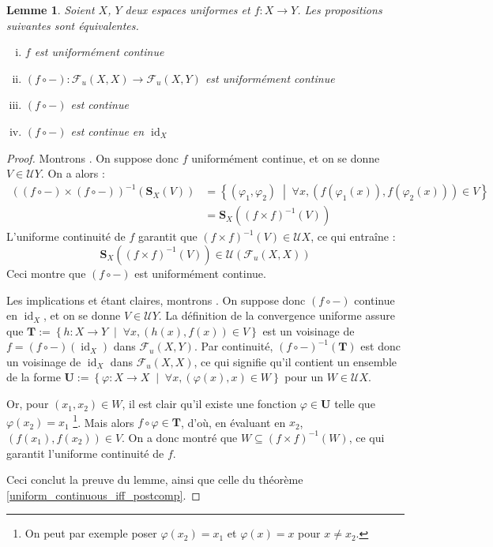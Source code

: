 \documentclass[a4paper,12pt]{article}
\newtheorem{lemma}[theorem]{Lemme}
\newcommand{\set}[1]{\left\{ #1 \right\}}
\newcommand{\tq}{\;\middle|\;}
\newcommand{\inv}{^{-1}}
\newcommand{\comp}{\circ}
\renewcommand{\implies}{\Rightarrow}
\newcommand{\blank}{{-}}
\DeclareMathOperator{\id}{id}
\begin{document}
\begin{lemma}
    Soient $X$, $Y$ deux espaces uniformes et $f:X\to Y$. Les propositions suivantes sont équivalentes.
    \begin{enumerate}[(i)]
        \item $f$ est uniformément continue
        \item $(f\comp\blank) : \mathcal{F}_u(X, X)\to\mathcal{F}_u(X, Y)$ est uniformément continue
        \item $(f\comp\blank)$ est continue
        \item $(f\comp\blank)$ est continue en $\id_X$
    \end{enumerate}
\end{lemma}

\begin{proof}
    Montrons \framebox{$(i)\implies(ii)$}. On suppose donc $f$ uniformément continue, et on se donne $V\in\mathcal{U}Y$. On a alors :
    \begin{align*}
        ((f\comp\blank)\times(f\comp\blank))\inv(\mathbf{S}_X(V)) 
            &= \set{(\varphi_1, \varphi_2)\tq\forall x, (f(\varphi_1(x)), f(\varphi_2(x)))\in V} \\
            &= \mathbf{S}_X((f\times f)\inv(V))
    \end{align*}
    L'uniforme continuité de $f$ garantit que $(f\times f)\inv(V)\in\mathcal{U}X$, ce qui entraîne :
    \begin{equation*}
        \mathbf{S}_X((f\times f)\inv(V))\in\mathcal{U}(\mathcal{F}_u(X, X))
    \end{equation*}
    Ceci montre que $(f\comp\blank)$ est uniformément continue.

    Les implications \framebox{$(ii)\implies(iii)$} et \framebox{$(iii)\implies(iv)$} étant claires, montrons
    \framebox{$(iv)\implies(i)$}. On suppose donc $(f\comp\blank)$ continue en $\id_X$, et on se donne 
    $V\in\mathcal{U}Y$. La définition de la convergence uniforme assure que 
    $\mathbf{T}:=\set{h : X\to Y\tq \forall x, (h(x), f(x))\in V}$ est un voisinage de $f = (f\comp\blank)(\id_X)$ dans 
    $\mathcal{F}_u(X, Y)$. Par continuité, $(f\comp\blank)\inv(\mathbf{T})$ est donc un voisinage de $\id_X$ dans $\mathcal{F}_u(X, X)$,
    ce qui signifie qu'il contient un ensemble de la forme $\mathbf{U}:=\set{\varphi : X\to X\tq \forall x, (\varphi(x), x)\in W}$ pour 
    un $W\in\mathcal{U}X$. 
    
    Or, pour $(x_1, x_2)\in W$, il est clair qu'il existe une fonction $\varphi\in\mathbf{U}$ telle que $\varphi(x_2) = x_1$
    \footnote{On peut par exemple poser $\varphi(x_2)=x_1$ et $\varphi(x) = x$ pour $x\ne x_2$.}.
    Mais alors $f\comp\varphi\in\mathbf{T}$, d'où, en évaluant en $x_2$, $(f(x_1),f(x_2))\in V$.
    On a donc montré que $W\subseteq (f\times f)\inv(W)$, ce qui garantit l'uniforme continuité de $f$.

    Ceci conclut la preuve du lemme, ainsi que celle du théorème \ref{uniform_continuous_iff_postcomp}.
\end{proof}
\end{document}
